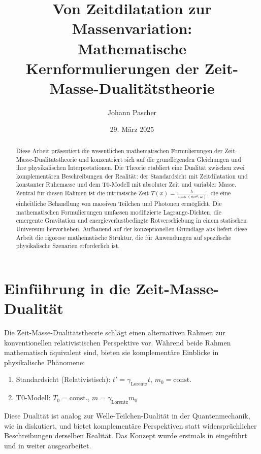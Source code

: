 \documentclass[12pt,a4paper]{article}
\title{Von Zeitdilatation zur Massenvariation: \\ Mathematische Kernformulierungen der Zeit-Masse-Dualitätstheorie}
\author{Johann Pascher}
\date{29. März 2025}
\newcommand{\Tfield}{T(x)}
\newcommand{\Tzero}{T_0}
\newcommand{\gammaf}{\gamma_{\text{Lorentz}}}
\theoremstyle{definition}
\theoremstyle{remark}
\begin{document}
	
	\maketitle
	
	\begin{abstract}
		Diese Arbeit präsentiert die wesentlichen mathematischen Formulierungen der Zeit-Masse-Dualitätstheorie und konzentriert sich auf die grundlegenden Gleichungen und ihre physikalischen Interpretationen. Die Theorie etabliert eine Dualität zwischen zwei komplementären Beschreibungen der Realität: der Standardsicht mit Zeitdilatation und konstanter Ruhemasse und dem T0-Modell mit absoluter Zeit und variabler Masse. Zentral für diesen Rahmen ist die intrinsische Zeit \( \Tfield = \frac{\hbar}{\max(m c^2, \omega)} \), die eine einheitliche Behandlung von massiven Teilchen und Photonen ermöglicht. Die mathematischen Formulierungen umfassen modifizierte Lagrange-Dichten, die emergente Gravitation und energieverlustbedingte Rotverschiebung in einem statischen Universum hervorheben. Aufbauend auf der konzeptionellen Grundlage aus \cite{pascher_zeit_masse_2025} liefert diese Arbeit die rigorose mathematische Struktur, die für Anwendungen auf spezifische physikalische Szenarien erforderlich ist.
	\end{abstract}
	
	\tableofcontents
	\newpage
	
	\section{Einführung in die Zeit-Masse-Dualität}
	Die Zeit-Masse-Dualitätstheorie schlägt einen alternativen Rahmen zur konventionellen relativistischen Perspektive vor. Während beide Rahmen mathematisch äquivalent sind, bieten sie komplementäre Einblicke in physikalische Phänomene:
	\begin{enumerate}
		\item Standardsicht (Relativistisch): \( t' = \gammaf t \), \( m_0 = \text{const.} \)
		\item T0-Modell: \( \Tzero = \text{const.} \), \( m = \gammaf m_0 \)
	\end{enumerate}
	
	Diese Dualität ist analog zur Welle-Teilchen-Dualität in der Quantenmechanik, wie in \cite{pascher_planck_2025} diskutiert, und bietet komplementäre Perspektiven statt widersprüchlicher Beschreibungen derselben Realität. Das Konzept wurde erstmals in \cite{pascher_zeit_masse_2025} eingeführt und in \cite{pascher_zeit_2025} weiter ausgearbeitet.
	
\end{document}
